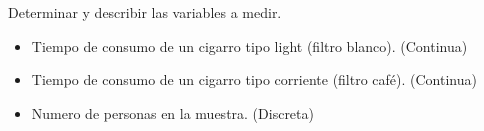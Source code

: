 Determinar y describir las variables a medir.
	\begin{itemize}
		\item Tiempo de consumo de un cigarro tipo light (filtro blanco). (Continua)
		\item Tiempo de consumo de un cigarro tipo corriente (filtro caf\'e). (Continua)
		\item Numero de personas en la muestra. (Discreta)
	\end{itemize}
